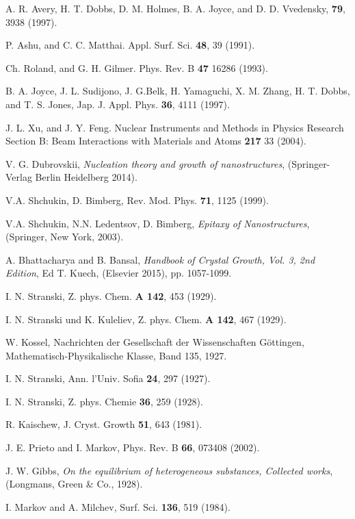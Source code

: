 \documentclass[aps,prl,showpacs,twocolumn,byrevtex,floatfix]{revtex4-1}
\begin{document}
\begin{thebibliography}{99}
A. R. Avery, H. T. Dobbs, D. M. Holmes, B. A. Joyce, and D. D. Vvedensky, {\bf
79}, 3938 (1997).

P. Ashu, and C. C. Matthai. Appl. Surf. Sci. {\bf 48}, 39 (1991).

Ch. Roland, and G. H. Gilmer. Phys. Rev. B {\bf 47} 16286 (1993).

B. A. Joyce, J. L. Sudijono, J. G.Belk, H. Yamaguchi, X. M. Zhang, H. T.
Dobbs, and T. S. Jones, Jap. J. Appl. Phys. {\bf 36}, 4111 (1997).

J. L. Xu, and J. Y. Feng. Nuclear Instruments and Methods in Physics
Research Section B: Beam Interactions with Materials and Atoms {\bf 217} 33
(2004).

V. G. Dubrovskii, {\it Nucleation theory and growth of nanostructures},
(Springer-Verlag Berlin Heidelberg 2014).

V.A. Shchukin, D. Bimberg, Rev. Mod. Phys. {\bf 71}, 1125 (1999).

V.A. Shchukin, N.N. Ledentsov, D. Bimberg, {\it Epitaxy of Nanostructures},
(Springer, New York, 2003).

A. Bhattacharya and B. Bansal, {\it Handbook of Crystal Growth, Vol. 3, 2nd
Edition}, Ed T. Kuech, (Elsevier 2015), pp. 1057-1099.


I. N. Stranski, Z. phys. Chem. {\bf A 142}, 453 (1929).

I. N. Stranski und K. Kuleliev, Z. phys. Chem. {\bf A 142}, 467 (1929).

W. Kossel, Nachrichten der Gesellschaft der Wissen\-schaften G\"ottingen,
Mathematisch-Physikalische Klasse, Band 135, 1927.

I. N. Stranski, Ann. l'Univ. Sofia {\bf 24}, 297 (1927).

I. N. Stranski, Z. phys. Chemie {\bf 36}, 259 (1928).

R. Kaischew, J. Cryst. Growth {\bf 51}, 643 (1981).

J. E. Prieto and I. Markov, Phys. Rev. B {\bf 66}, 073408 (2002).

J. W. Gibbs, {\it On the equilibrium of heterogeneous substances, Collected
works}, (Longmans, Green \& Co., 1928).


I. Markov and A. Milchev, Surf. Sci. {\bf 136}, 519 (1984).


\end{thebibliography}
\end{document}
